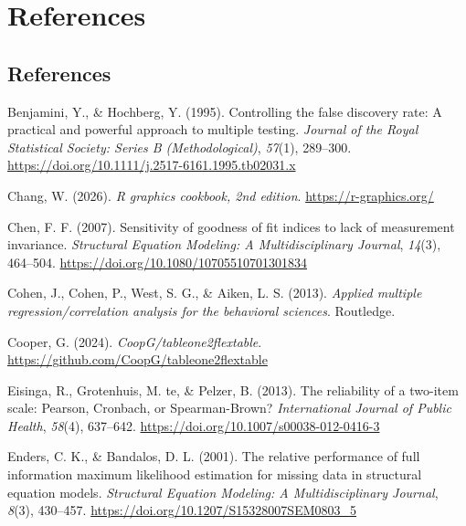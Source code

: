 \documentclass[
  letterpaper,
  DIV=11,
  numbers=noendperiod]{scrreprt}
\newlength{\cslhangindent}
\newenvironment{CSLReferences}[2] %
 {\begin{list}{}{%
  \setlength{\itemindent}{0pt}
  \setlength{\leftmargin}{0pt}
  \setlength{\parsep}{0pt}
  \ifodd #1
   \setlength{\leftmargin}{\cslhangindent}
   \setlength{\itemindent}{-1\cslhangindent}
  \fi
  \setlength{\itemsep}{#2\baselineskip}}}
 {\end{list}}
\begin{document}
\part{References}

\chapter*{References}\label{references-5}


\label{refs}
\begin{CSLReferences}{1}{0}
Benjamini, Y., \& Hochberg, Y. (1995). Controlling the false discovery
rate: A practical and powerful approach to multiple testing.
\emph{Journal of the Royal Statistical Society: Series B
(Methodological)}, \emph{57}(1), 289--300.
\url{https://doi.org/10.1111/j.2517-6161.1995.tb02031.x}

Chang, W. (2026). \emph{R graphics cookbook, 2nd edition}.
\url{https://r-graphics.org/}

Chen, F. F. (2007). Sensitivity of goodness of fit indices to lack of
measurement invariance. \emph{Structural Equation Modeling: A
Multidisciplinary Journal}, \emph{14}(3), 464--504.
\url{https://doi.org/10.1080/10705510701301834}

Cohen, J., Cohen, P., West, S. G., \& Aiken, L. S. (2013). \emph{Applied
multiple regression/correlation analysis for the behavioral sciences}.
Routledge.

Cooper, G. (2024). \emph{CoopG/tableone2flextable}.
\url{https://github.com/CoopG/tableone2flextable}

Eisinga, R., Grotenhuis, M. te, \& Pelzer, B. (2013). The reliability of
a two-item scale: Pearson, Cronbach, or Spearman-Brown?
\emph{International Journal of Public Health}, \emph{58}(4), 637--642.
\url{https://doi.org/10.1007/s00038-012-0416-3}

Enders, C. K., \& Bandalos, D. L. (2001). The relative performance of
full information maximum likelihood estimation for missing data in
structural equation models. \emph{Structural Equation Modeling: A
Multidisciplinary Journal}, \emph{8}(3), 430--457.
\url{https://doi.org/10.1207/S15328007SEM0803_5}


\end{CSLReferences}
\end{document}
